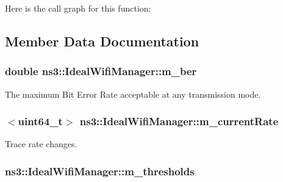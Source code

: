 Here is the call graph for this function\+:




\subsection{Member Data Documentation}
\subsubsection[{\texorpdfstring{m\+\_\+ber}{m_ber}}]{\setlength{\rightskip}{0pt plus 5cm}double ns3\+::\+Ideal\+Wifi\+Manager\+::m\+\_\+ber\hspace{0.3cm}{\ttfamily [private]}}\hypertarget{classns3_1_1IdealWifiManager_a470ced4d78876560eaffb1d96cb2a1d9}{}\label{classns3_1_1IdealWifiManager_a470ced4d78876560eaffb1d96cb2a1d9}


The maximum Bit Error Rate acceptable at any transmission mode. 

\subsubsection[{\texorpdfstring{m\+\_\+current\+Rate}{m_currentRate}}]{$<$uint64\+\_\+t$>$ ns3\+::\+Ideal\+Wifi\+Manager\+::m\+\_\+current\+Rate\hspace{0.3cm}{\ttfamily [private]}}\hypertarget{classns3_1_1IdealWifiManager_ace233bd5a507e354ee1eac6c77b3944b}{}\label{classns3_1_1IdealWifiManager_ace233bd5a507e354ee1eac6c77b3944b}


Trace rate changes. 

\subsubsection[{\texorpdfstring{m\+\_\+thresholds}{m_thresholds}}]{ ns3\+::\+Ideal\+Wifi\+Manager\+::m\+\_\+thresholds\hspace{0.3cm}{\ttfamily [private]}}\hypertarget{classns3_1_1IdealWifiManager_add5cf767e7cc6a6d86da48d7be2ed2c9}{}\label{classns3_1_1IdealWifiManager_add5cf767e7cc6a6d86da48d7be2ed2c9}


